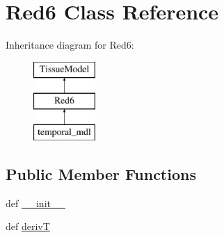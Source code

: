 \hypertarget{classcell__mdl2_1_1_red6}{
\section{Red6 Class Reference}
\label{classcell__mdl2_1_1_red6}
}
Inheritance diagram for Red6:\begin{figure}[H]
\begin{center}
\leavevmode
\includegraphics[height=3cm]{classcell__mdl2_1_1_red6}
\end{center}
\end{figure}
\subsection*{Public Member Functions}
\begin{DoxyCompactItemize}
\item 
def \hyperlink{classcell__mdl2_1_1_red6_ac775ee34451fdfa742b318538164070e}{\_\-\_\-init\_\-\_\-}
\item 
def \hyperlink{classcell__mdl2_1_1_red6_ad67701a6bb599a16a9eb386aa1cd4328}{derivT}
\end{DoxyCompactItemize}
